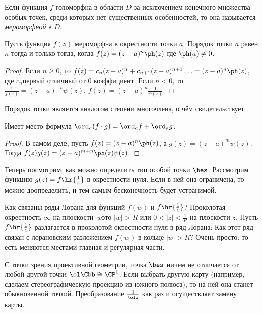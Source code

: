 \documentclass[a4paper]{article}
\begin{document}
\begin{df}
Если функция $f$ голоморфна в области $D$ за исключением конечного множества особых точек, среди которых нет
существенных особенностей, то она называется \emph{мероморфной} в $D$.
\end{df}

\begin{stm}
Пусть функция $f(z)$ мероморфна в окрестности точки $a$. Порядок точки $a$ равен $n$ тогда и только тогда, когда
$f(z)=(z-a)^n\ph(z)$ где $\ph(a) \neq 0$.
\end{stm}
\begin{proof}
Если $n \ge 0$, то $f(z)=c_{n}(z-a)^n+c_{n+1}(z-a)^{n+1}\ldots = (z-a)^n\ph(z)$, где $c_n$\т первый отличный от $0$
коэффициент. Если $n < 0$, то $\frac{1}{f(z)}=(z-a)^{-n}\psi(z)$,  $f(z)=(z-a)^n\frac{1}{\psi(z)}$.
\end{proof}

Порядок точки является аналогом степени многочлена, о чём свидетельствует
\begin{lemma}
Имеет место формула $\ord_a(f\cdot g) = \ord_a f + \ord_a g$.
\end{lemma}
\begin{proof}
В самом деле, пусть $f(z)=(z-a)^n\ph(z)$, а $g(z)=(z-a)^m\psi(z)$. Тогда $f(z)g(z) = (z-a)^{m+n}\ph(z)\psi(z)$.
\end{proof}


Теперь посмотрим, как можно определить тип особой точки $\bes$. Рассмотрим функцию $g(z)=f\hr{\frac1z}$ в
окрестности нуля. Если в ней она ограничена, то можно доопределить, и тем самым бесконечность будет устранимой.

Как связаны ряды Лорана для функций $f(w)$ и $f\hr{\frac1z}$? Проколотая окрестность $\infty$ на
плоскости~$w$\т это $|w|>R$ или $0<|z|<\frac1R$ на плоскости $z$. Пусть $f\hr{\frac1z}$ разлагается в
проколотой окрестности нуля в ряд Лорана:
Как этот ряд связан с лорановским разложением $f(w)$ в кольце $|w|>R$? Очень просто:
то есть меняются местами главная и регулярная части.

\begin{note}
С точки зрения проективной геометрии, точка $\bes$ ничем не отличается от любой другой точки $\ol \Cbb \cong \CP^1$.
Если выбрать другую карту (например, сделаем стереографическую проекцию из южного полюса), то на ней она
станет обыкновенной точкой. Преобразование $\frac{1}{\ol z}$ как раз и осуществляет замену карты.
\end{note}
\end{document}
